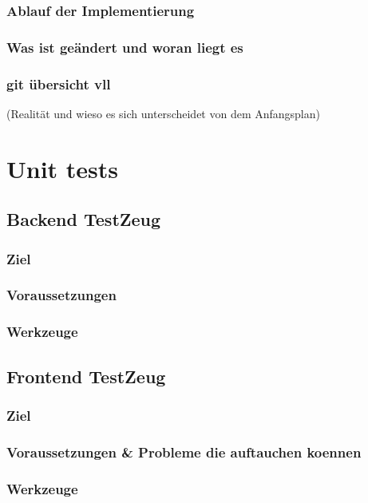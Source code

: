 \documentclass[parskip=full,11pt,twoside]{scrartcl}
\begin{document}
\subsubsection{Ablauf der Implementierung}
\subsubsection{Was ist geändert und woran liegt es}
\subsubsection{git übersicht vll}
 (Realität und wieso es sich unterscheidet von dem Anfangsplan)
\pagebreak

\section{Unit tests}
\subsection{Backend TestZeug}
\subsubsection{Ziel}
\subsubsection{Voraussetzungen}
\subsubsection{Werkzeuge}
\subsection{Frontend TestZeug}
\subsubsection{Ziel}
\subsubsection{Voraussetzungen \& Probleme die auftauchen koennen}
\subsubsection{Werkzeuge}
\pagebreak
\end{document}
